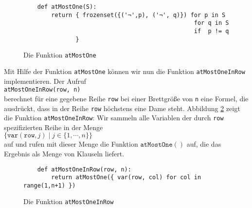 \begin{figure}[!ht]
  \centering
\begin{verbatim}
    def atMostOne(S): 
        return { frozenset({('¬',p), ('¬', q)}) for p in S
                                                 for q in S 
                                                 if  p != q 
               }
\end{verbatim}
\vspace*{-0.3cm}
  \caption{Die Funktion \texttt{atMostOne}}
  \label{fig:atMostOne}
\end{figure}

Mit Hilfe der Funktion \texttt{atMostOne} können wir nun die Funktion
\texttt{atMostOneInRow} implementieren.  Der Aufruf \\[0.2cm]
\hspace*{1.3cm} 
\texttt{atMostOneInRow(row, n)} \\[0.2cm]
berechnet für eine gegebene Reihe \texttt{row} bei einer Brettgröße von \texttt{n} eine Formel,
die ausdrückt, dass in der Reihe \texttt{row} höchstens eine Dame steht.
Abbildung \ref{fig:atMostOneInRow} zeigt die
Funktion \texttt{atMostOneInRow}: Wir sammeln alle Variablen der durch \texttt{row}
spezifizierten Reihe
in der Menge 
\\[0.2cm]
\hspace*{1.3cm}
$\bigl\{ \texttt{var}(\texttt{row},j) \mid j \in \{1, \cdots, n \} \bigr\}$
\\[0.2cm]
 auf und rufen mit dieser Menge die Funktion $\texttt{atMostOne}()$ auf, die das Ergebnis
als Menge von Klauseln liefert.

\begin{figure}[!ht]
  \centering
\begin{verbatim}
    def atMostOneInRow(row, n):
        return atMostOne({ var(row, col) for col in range(1,n+1) })
\end{verbatim}
\vspace*{-0.3cm}
  \caption{Die Funktion \texttt{atMostOneInRow}}
  \label{fig:atMostOneInRow}
\end{figure}

